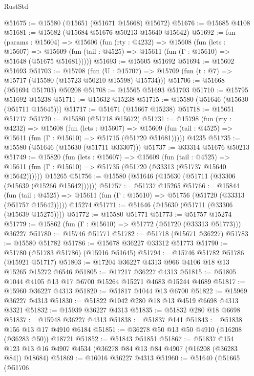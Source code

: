 \begin{lexlean}{RustStd}
\begin{coremodule}
@51675 := @15580 (@15651 (@51671 @15668) @15672)
@51676 := @15685 @4108
@51681 := @15682 (@15684 @51676 @50213 @15640 @15642)
@51692 := fun (params : @15604) =>
  @15606
    (fun (rty : @4232) =>
    @15608
      (fun (lets : @15607) =>
      @15609 (fun (tail : @4525) => @15611 (fun (Γ : @15610) => @51648 (@51675 @51681)))))
@51693 := @15605 @51692
@51694 := @15602 @51693
@51703 := @15708
    (fun (U : @15707) => @15709 (fun (t : @7) => @15717 (@15580 (@15723 @50210 @15598) @15734)))
@51706 := @51668 (@51694 @51703) @50208
@51708 := @15565 @51693 @51703
@51710 := @15795 @51692 @15238
@51711 := @15632 @15238
@51715 := @15580 (@51646 (@15630 (@51711 @15645)))
@51717 := @51671 (@15667 @15238)
@51718 := @15651 @51717
@51720 := @15580 (@51718 @15672)
@51731 := @15798
    (fun (rty : @4232) =>
    @15608
      (fun (lets : @15607) =>
      @15609 (fun (tail : @4525) => @15611 (fun (Γ : @15610) => @51715 (@51720 @51681)))))
    @4235
@51735 := @15580 (@51646 (@15630 (@51711 @33307)))
@51737 := @33314 @51676 @50213
@51749 := @15820
    (fun (lets : @15607) =>
    @15609
      (fun (tail : @4525) =>
      @15611 (fun (Γ : @15610) => @51735 (@51720 (@33313 (@51737 @15640 @15642))))))
    @15265
@51756 := @15580 (@51646 (@15630 (@51711 (@33306 (@15639 (@15266 @15642))))))
@51757 := @51737 @15265
@51766 := @15844
    (fun (tail : @4525) => @15611 (fun (Γ : @15610) => @51756 (@51720 (@33313 (@51757 @15642)))))
    @15274
@51771 := @51646 (@15630 (@51711 (@33306 (@15639 @15275))))
@51772 := @15580 @51771
@51773 := @51757 @15274
@51779 := @15862 (fun (Γ : @15610) => @51772 (@51720 (@33313 @51773))) @36227
@51780 := @15746 @51771
@51782 := @51718 (@15671 @36227)
@51783 := @15580 @51782
@51786 := @15678 @36227 @33312 @51773
@51790 := @51780 (@51783 @51786) (@15916 @51645)
@51794 := @15746 @51782 @51786 (@15921 @51717)
@51803 := @17204 @36227 @4313 @966 @4106 @18 @13 @15265 @15272 @6546
@51805 := @17217 @36227 @4313
@51815 := @51805 @1044 @4105 @13 @17 @6700 @15264 @15271 @4683 @15244 @4689
@51817 := @15960 @36227 @4313
@51820 := @51817 @1044 @13 @6700
@51822 := @15969 @36227 @4313
@51830 := @51822 @1042 @280 @18 @13 @4519 @6698 @4313 @3321
@51832 := @15939 @36227 @4313
@51835 := @51832 @280 @18 @6698
@51837 := @15948 @36227 @4313
@51838 := @51837 @141
@51843 := @51838 @156 @13 @17 @4910 @6184
@51851 := @36278 @50 @13 @50 @4910 (@16208 (@36283 @50)) @18721
@51852 := @51843 @51851
@51867 := @51837
    @154
    @123
    @13
    @16
    @4907
    @4534
    (@36278 @84 @13 @84 @4907 (@16208 (@36283 @84)) @18684)
@51869 := @16016 @36227 @4313
@51960 := @51640
    (@51665
      (@51706

\end{coremodule}
\end{lexlean}
